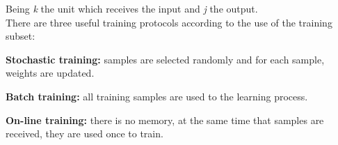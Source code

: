 Being \textit{k} the unit which receives the input and \textit{j} the output.\\

There are three useful training protocols according to the use of the training subset:
\begin{description}[itemsep=2pt,topsep=8pt,parsep=0pt,partopsep=20pt]
	\item \textbf{Stochastic training:} samples are selected randomly and for each sample, weights are updated.
	 \item \textbf{Batch training:} all training samples are used to the learning process.
	 \item \textbf{On-line training:} there is no memory, at the same time that samples are received, they are used once to train.
\end{description}


